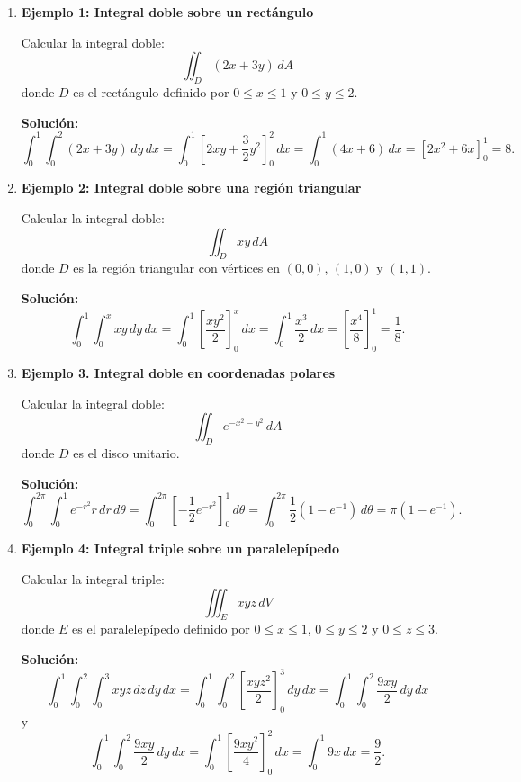 \documentclass[11pt]{book}
\theoremstyle{definicion}
\theoremstyle{teorema}
\theoremstyle{ejemplo}
\begin{document}
\begin{enumerate}

\item \textbf{Ejemplo 1: Integral doble sobre un rectángulo}

Calcular la integral doble:
\[
\iint_D (2x + 3y) \, dA
\]
donde \( D \) es el rectángulo definido por \( 0 \leq x \leq 1 \) y \( 0 \leq y \leq 2 \).

\textbf{Solución:}
\[
\int_{0}^{1} \int_{0}^{2} (2x + 3y) \, dy \, dx = \int_{0}^{1} \left[ 2xy + \frac{3}{2}y^2 \right]_{0}^{2} \, dx = \int_{0}^{1} (4x + 6) \, dx = \left[ 2x^2 + 6x \right]_{0}^{1} = 8.
\]

\item \textbf{Ejemplo 2: Integral doble sobre una región triangular}

Calcular la integral doble:
\[
\iint_D xy \, dA
\]
donde \( D \) es la región triangular con vértices en \( (0,0) \), \( (1,0) \) y \( (1,1) \).

\textbf{Solución:}
\[
\int_{0}^{1} \int_{0}^{x} xy \, dy \, dx = \int_{0}^{1} \left[ \frac{x y^2}{2} \right]_{0}^{x} \, dx = \int_{0}^{1} \frac{x^3}{2} \, dx = \left[ \frac{x^4}{8} \right]_{0}^{1} = \frac{1}{8}.
\]

\item \textbf{Ejemplo 3. Integral doble en coordenadas polares}

Calcular la integral doble:
\[
\iint_D e^{-x^2-y^2} \, dA
\]
donde \( D \) es el disco unitario.

\textbf{Solución:}
\[
\int_{0}^{2\pi} \int_{0}^{1} e^{-r^2} r \, dr \, d\theta = \int_{0}^{2\pi} \left[ -\frac{1}{2} e^{-r^2} \right]_{0}^{1} \, d\theta = \int_{0}^{2\pi} \frac{1}{2} (1 - e^{-1}) \, d\theta = \pi (1 - e^{-1}).
\]

\item \textbf{Ejemplo 4: Integral triple sobre un paralelepípedo}

Calcular la integral triple:
\[
\iiint_E xyz \, dV
\]
donde \( E \) es el paralelepípedo definido por \( 0 \leq x \leq 1 \), \( 0 \leq y \leq 2 \) y \( 0 \leq z \leq 3 \).

\textbf{Solución:}
\[
\int_{0}^{1} \int_{0}^{2} \int_{0}^{3} xyz \, dz \, dy \, dx = \int_{0}^{1} \int_{0}^{2} \left[ \frac{xyz^2}{2} \right]_{0}^{3} \, dy \, dx = \int_{0}^{1} \int_{0}^{2} \frac{9xy}{2} \, dy \, dx %
\]
y
\[
\int_{0}^{1} \int_{0}^{2} \frac{9xy}{2} \, dy \, dx = \int_{0}^{1} \left[ \frac{9xy^2}{4} \right]_{0}^{2} \, dx = \int_{0}^{1} 9x \, dx = \frac{9}{2}.
\]


\end{enumerate}
\end{document}
